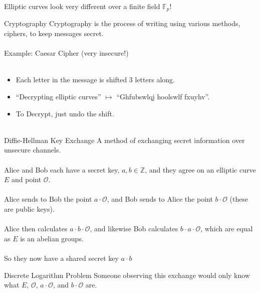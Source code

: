 \documentclass{beamer}
\begin{document}
\begin{frame}
	Elliptic curves look very different over a finite field $\mathbb{F}_{p}$!	
\end{frame}

\begin{frame}[t]{Cryptography}
	Cryptography is the process of writing using various methods, ciphers, to keep messages secret. \\~\\
	
	Example: Caesar Cipher (very insecure!) \\~\\
	\begin{itemize}
		\item Each letter in the message is shifted 3 letters along.
		\item ``Decrypting elliptic curves'' $\mapsto$ ``Ghfubswlqj hoolswlf fxuyhv''.
		\item To Decrypt, just undo the shift. \\~\\
	\end{itemize}
\end{frame}

\begin{frame}[t]{Diffie-Hellman Key Exchange}
	A method of exchanging secret information over unsecure channels. \\~\\
	
	Alice and Bob each have a secret key, $a, b \in \mathbb{Z}$, and they agree on an elliptic curve $E$ and point $\mathcal{O}$. \\~\\
	
	Alice sends to Bob the point $a \cdot \mathcal{O}$, and Bob sends to Alice the point $b \cdot \mathcal{O}$ (these are public keys). \\~\\
	
	Alice then calculates $a \cdot b \cdot \mathcal{O}$, and likewise Bob calculates $b \cdot a \cdot \mathcal{O}$, which are equal as $E$ is an abelian groups. \\~\\
	
	So they now have a shared secret key $a \cdot b$
\end{frame}

\begin{frame}[t]{Discrete Logarithm Problem}
	Someone observing this exchange would only know what $E$, $\mathcal{O}$, $a\cdot \mathcal{O}$, and $b\cdot \mathcal{O}$ are.
	
\end{frame}
\end{document}
